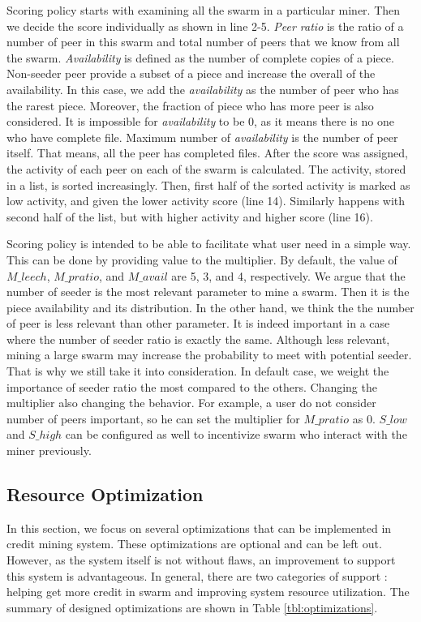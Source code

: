 Scoring policy starts with examining all the swarm in a particular miner. Then we decide the score individually as shown in line 2-5. \textit{Peer ratio} is the ratio of a number of peer in this swarm and total number of peers that we know from all the swarm. \textit{Availability} is defined as the number of complete copies of a piece. Non-seeder peer provide a subset of a piece and increase the overall of the availability. In this case, we add the \textit{availability} as the number of peer who has the rarest piece. Moreover, the fraction of piece who has more peer is also considered. It is impossible for \textit{availability} to be 0, as it means there is no one who have complete file. Maximum number of \textit{availability} is the number of peer itself. That means, all the peer has completed files. After the score was assigned, the activity of each peer on each of the swarm is calculated. The activity, stored in a list, is sorted increasingly. Then, first half of the sorted activity is marked as low activity, and given the lower activity score (line 14). Similarly happens with second half of the list, but with higher activity and higher score (line 16).

Scoring policy is intended to be able to facilitate what user need in a simple way. This can be done by providing value to the multiplier. By default, the value of $M\_leech$, $M\_pratio$, and $M\_avail$ are 5, 3, and 4, respectively. We argue that the number of seeder is the most relevant parameter to mine a swarm. Then it is the piece availability and its distribution. In the other hand, we think the the number of peer is less relevant than other parameter. It is indeed important in a case where the number of seeder ratio is exactly the same. Although less relevant, mining a large swarm may increase the probability to meet with potential seeder. That is why we still take it into consideration. In default case, we weight the importance of seeder ratio the most compared to the others. Changing the multiplier also changing the behavior. For example, a user do not consider number of peers important, so he can set the multiplier for $M\_pratio$ as 0. $S\_low$ and $S\_high$ can be configured as well to incentivize swarm who interact with the miner previously.

\subsection{Resource Optimization}
\label{section:optimization}
In this section, we focus on several optimizations that can be implemented in credit mining system. These optimizations are optional and can be left out. However, as the system itself is not without flaws, an improvement to support this system is advantageous. In general, there are two categories of support : helping get more credit in swarm and improving system resource utilization. The summary of designed optimizations are shown in Table \ref{tbl:optimizations}.

